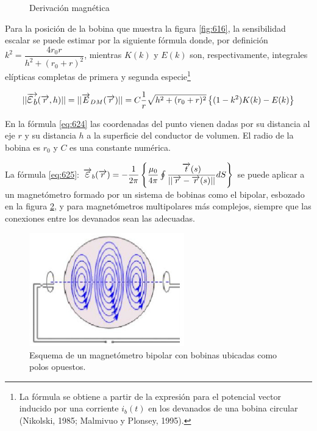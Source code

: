 \begin{figure}[H]
\begin{minipage}[b]{0.5\textwidth}
     \caption{Derivación magnética}
	\label{fig:617}
  \end{minipage}
\end{figure}


Para la posición de la bobina que muestra la figura \ref{fig:616}, la sensibilidad escalar se puede estimar por la siguiente fórmula donde, por definición $k^{2}=\dfrac{4r_{0}r}{h^{2}+(r_{0}+r)^{2}}$, mientras $K(k)$ y $E(k)$ son, respectivamente, integrales elípticas completas de primera y segunda especie\footnote{La fórmula se obtiene a partir de la expresión para el potencial vector inducido por una corriente $i_{b}(t)$ en los devanados de una bobina circular (Nikolski, 1985; Malmivuo y Plonsey, 1995).}

\begin{equation}
	\label{eq:624}
	\vert\vert \V{\Bb{\varepsilon}_{b}}(\V{r}, h) \vert\vert = 
	\vert\vert \V{E}_{DM}(\V{r}) \vert\vert = 
	C\dfrac{1}{r}\sqrt{h^{2}+(r_{0}+r)^{2}}\left\lbrace (1-k^{2})K(k)-E(k) \right\rbrace 
\end{equation}

En la fórmula \ref{eq:624} las coordenadas del punto vienen dadas por su distancia al eje $r$ y su distancia $h$ a la superficie del conductor de volumen. El radio de la bobina es $r_{0}$ y $C$ es una constante numérica.

La fórmula \ref{eq:625}: $\V{\Bb{\varepsilon}}_{b}(\V{r})= -\dfrac{1}{2\pi} \left\lbrace \dfrac{\mu_{0}}{4\pi} \oint \dfrac{\V{t}(s)}{\vert\vert \V{r}-\V{r}(s) \vert\vert } dS  \right\rbrace$ se puede aplicar a un magnetómetro formado por un sistema de bobinas como el bipolar, esbozado en la figura \ref{fig:618}, y para magnetómetros multipolares más complejos, siempre que las conexiones entre los devanados sean las adecuadas.


\begin{figure}[H]
    \centering
    \includegraphics[width=0.6\textwidth]{./Figures/fig618}
	\caption{Esquema de un magnetómetro bipolar con bobinas ubicadas como polos opuestos.}
	\label{fig:618}
\end{figure}

